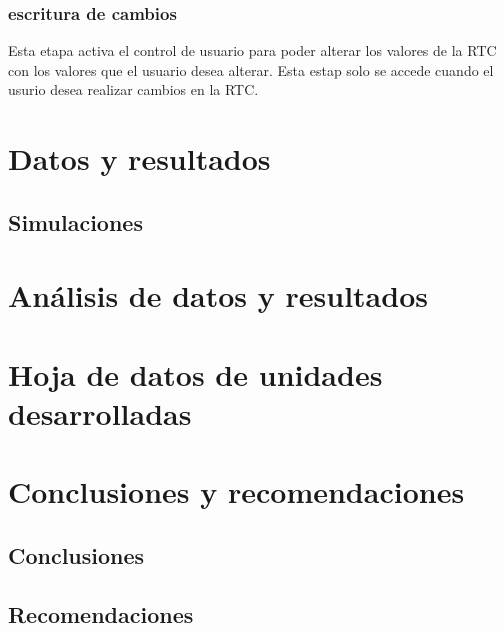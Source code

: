 \documentclass[12pt,a4paper]{article}
\begin{document}
		\subsubsection{escritura de cambios}
		
		Esta etapa activa el control de usuario para poder alterar los valores de la RTC con los valores que el usuario desea alterar. Esta estap solo se accede cuando el usurio desea realizar cambios en la RTC.
		
		
		\section{Datos y resultados}
		\subsection{Simulaciones}
		
		
		\section{Análisis de datos y resultados}
		
		
		\section{Hoja de datos de unidades desarrolladas}
		
		
		\section{Conclusiones y recomendaciones}
		\subsection{Conclusiones}
		
		
		\subsection{Recomendaciones}
		
		
	
\end{document}
